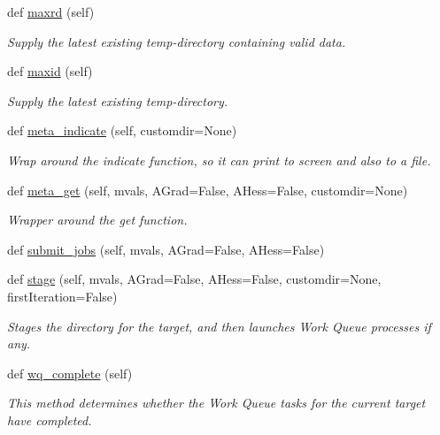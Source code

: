 \begin{DoxyCompactItemize}
def \hyperlink{classsrc_1_1target_1_1Target_ac295603ea071c6b6db55b7c2cf89890a}{maxrd} (self)
\begin{DoxyCompactList}\small\item\em Supply the latest existing temp-\/directory containing valid data. \end{DoxyCompactList}\item 
def \hyperlink{classsrc_1_1target_1_1Target_a9517cd2799579d5fa5aa407fc79fff44}{maxid} (self)
\begin{DoxyCompactList}\small\item\em Supply the latest existing temp-\/directory. \end{DoxyCompactList}\item 
def \hyperlink{classsrc_1_1target_1_1Target_a75dc5c4428df625f265e481f61718ec1}{meta\+\_\+indicate} (self, customdir=None)
\begin{DoxyCompactList}\small\item\em Wrap around the indicate function, so it can print to screen and also to a file. \end{DoxyCompactList}\item 
def \hyperlink{classsrc_1_1target_1_1Target_a14ccb9a63ebc92a83ead58965f13fcc7}{meta\+\_\+get} (self, mvals, A\+Grad=False, A\+Hess=False, customdir=None)
\begin{DoxyCompactList}\small\item\em Wrapper around the get function. \end{DoxyCompactList}\item 
def \hyperlink{classsrc_1_1target_1_1Target_a4a2cfc8acc2431063572174a99494215}{submit\+\_\+jobs} (self, mvals, A\+Grad=False, A\+Hess=False)
\item 
def \hyperlink{classsrc_1_1target_1_1Target_af543ca7235b5112aa29018ffa7bc1e1c}{stage} (self, mvals, A\+Grad=False, A\+Hess=False, customdir=None, first\+Iteration=False)
\begin{DoxyCompactList}\small\item\em Stages the directory for the target, and then launches Work Queue processes if any. \end{DoxyCompactList}\item 
def \hyperlink{classsrc_1_1target_1_1Target_aeb7582896efcfe1d0316a4ee80fc5634}{wq\+\_\+complete} (self)
\begin{DoxyCompactList}\small\item\em This method determines whether the Work Queue tasks for the current target have completed. \end{DoxyCompactList}\item 

\end{DoxyCompactItemize}
